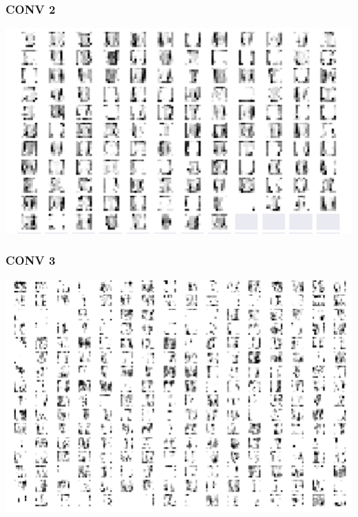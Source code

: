 \documentclass[12pt]{report}
\begin{document}
\subsubsection{CONV 2}
\begin{center}
\includegraphics[scale=0.8]{con2.png}
\end{center}

\subsubsection{CONV 3}
\begin{center}
\includegraphics[scale=0.8]{conv3.png}
\end{center}
\end{document}
